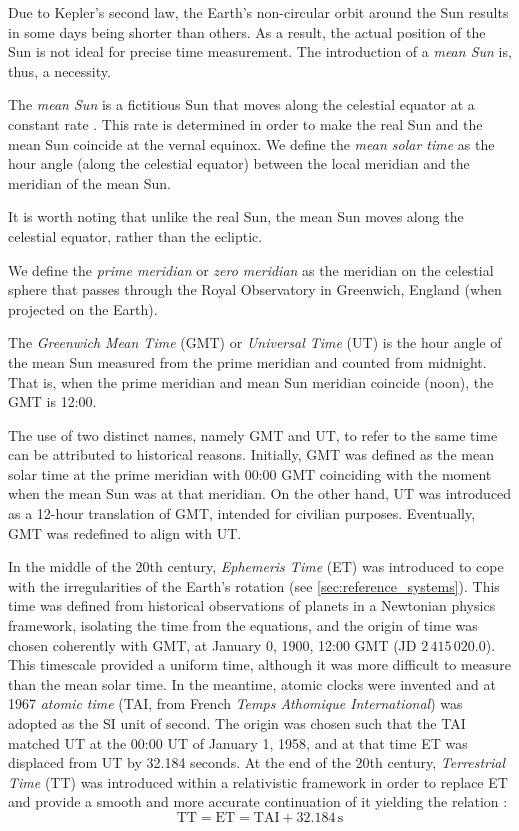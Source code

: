 \documentclass[../main.tex]{subfiles}
\begin{document}
Due to Kepler's second law, the Earth's non-circular orbit around the Sun results in some days being shorter than others. As a result, the actual position of the Sun is not ideal for precise time measurement. The introduction of a \emph{mean Sun} is, thus, a necessity.

\begin{definition}
  The \emph{mean Sun} is a fictitious Sun that moves along the celestial equator at a constant rate \cite{vallado}. This rate is determined in order to make the real Sun and the mean Sun coincide at the vernal equinox. We define the \emph{mean solar time} as the hour angle (along the celestial equator) between the local meridian and the meridian of the mean Sun.
\end{definition}
It is worth noting that unlike the real Sun, the mean Sun moves along the celestial equator, rather than the ecliptic.
\begin{definition}
  We define the \emph{prime meridian} or \emph{zero meridian} as the meridian on the celestial sphere that passes through the Royal Observatory in Greenwich, England (when projected on the Earth).
\end{definition}
\begin{definition}
  The \emph{Greenwich Mean Time} (GMT) or \emph{Universal Time} (UT) is the hour angle of the mean Sun measured from the prime meridian and counted from midnight. That is, when the prime meridian and mean Sun meridian coincide (noon), the GMT is 12:00.
\end{definition}
The use of two distinct names, namely GMT and UT, to refer to the same time can be attributed to historical reasons. Initially, GMT was defined as the mean solar time at the prime meridian with 00:00 GMT coinciding with the moment when the mean Sun was at that meridian. On the other hand, UT was introduced as a 12-hour translation of GMT, intended for civilian purposes. Eventually, GMT was redefined to align with UT.

In the middle of the 20th century, \emph{Ephemeris Time} (ET) was introduced to cope with the irregularities of the Earth's rotation (see \cref{sec:reference_systems}). This time was defined from historical observations of planets in a Newtonian physics framework, isolating the time from the equations, and the origin of time was chosen coherently with GMT, at January 0, 1900, 12:00 GMT (JD $2\,415\,020.0$). This timescale provided a uniform time, although it was more difficult to measure than the mean solar time. In the meantime, atomic clocks were invented and at 1967 \emph{atomic time} (TAI, from French \emph{Temps Athomique International}) was adopted as the SI unit of second. The origin was chosen such that the TAI matched UT at the 00:00 UT of January 1, 1958, and at that time ET was displaced from UT by 32.184 seconds. At the end of the 20th century, \emph{Terrestrial Time} (TT) was introduced within a relativistic framework in order to replace ET and provide a smooth and more accurate continuation of it yielding the relation \cite{montenbruck}:
\begin{equation}
  \text{TT}=\text{ET}= \text{TAI} + 32.184\,\mathrm{s}
\end{equation}
\end{document}
